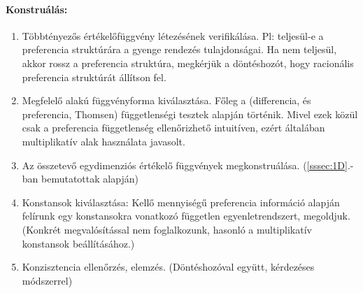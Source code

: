 \documentclass[a4paper,12pt]{article}
\begin{document}
\paragraph{Konstruálás: }

\begin{enumerate}
\item Többtényezős értékelőfüggvény létezésének verifikálása. Pl: teljesül-e a preferencia struktúrára a gyenge rendezés tulajdonságai. Ha nem teljesül, akkor rossz a preferencia struktúra, megkérjük a döntéshozót, hogy racionális preferencia struktúrát állítson fel. %
\item Megfelelő alakú függvényforma kiválasztása. Főleg a (differencia, és preferencia, Thomsen) függetlenségi tesztek alapján történik. Mivel ezek közül csak a preferencia függetlenség ellenőrizhető intuitíven, ezért általában multiplikatív alak használata javasolt.
\item Az összetevő egydimenziós értékelő függvények megkonstruálása. (\ref{sssec:1D}.-ban bemutatottak alapján)
\item Konstansok kiválasztása: Kellő mennyiségű preferencia információ alapján felírunk egy konstansokra vonatkozó független egyenletrendszert, megoldjuk. (Konkrét megvalósítással nem foglalkozunk, hasonló a multiplikatív konstansok beállításához.)
\item Konzisztencia ellenőrzés, elemzés. (Döntéshozóval együtt, kérdezéses módszerrel)
\end{enumerate}
\end{document}
